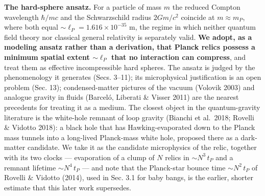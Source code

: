 \documentclass[
  11pt,
]{article}
\begin{document}
\textbf{The hard-sphere ansatz.} For a particle of mass \(m\) the
reduced Compton wavelength \(\hbar/mc\) and the Schwarzschild radius
\(2Gm/c^2\) coincide at \(m \approx m_P\), where both equal
\(\sim\!\ell_P = 1.616\times10^{-35}\) m, the regime in which neither
quantum field theory nor classical general relativity is separately
valid. \textbf{We adopt, as a modeling ansatz rather than a derivation,
that Planck relics possess a minimum spatial extent \(\sim\!\ell_P\)
that no interaction can compress}, and treat them as effective
incompressible hard spheres. The ansatz is judged by the phenomenology
it generates (Secs. 3--11); its microphysical justification is an open
problem (Sec. 13); condensed-matter pictures of the vacuum (Volovik
2003) and analogue gravity in fluids (Barceló, Liberati \& Visser 2011)
are the nearest precedents for treating it as a medium. The closest
object in the quantum-gravity literature is the white-hole remnant of
loop gravity (Bianchi et al.~2018; Rovelli \& Vidotto 2018): a black
hole that has Hawking-evaporated down to the Planck mass tunnels into a
long-lived Planck-mass white hole, proposed there as a dark-matter
candidate. We take it as the candidate microphysics of the relic,
together with its two clocks --- evaporation of a clump of \(N\) relics
in \(\sim N^3\,t_P\) and a remnant lifetime \(\sim N^4\,t_P\) --- and
note that the Planck-star bounce time \(\sim N^2\,t_P\) of Rovelli \&
Vidotto (2014), used in Sec. 3.1 for baby bangs, is the earlier, shorter
estimate that this later work supersedes.
\end{document}
